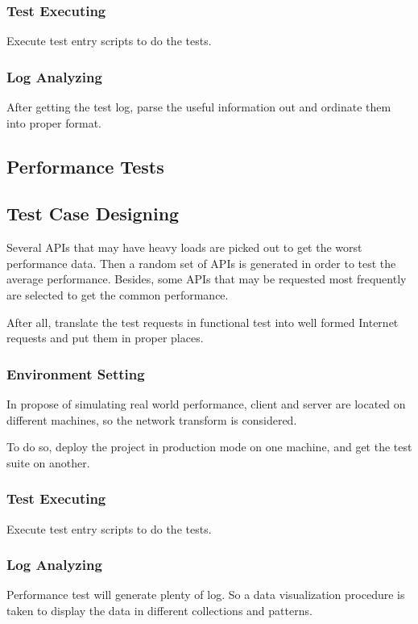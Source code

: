     \subsubsection{Test Executing}
      Execute test entry scripts to do the tests.
    \subsubsection{Log Analyzing}
      After getting the test log, parse the useful information out and ordinate them into proper format.
  \subsection{Performance Tests}
    \subsection{Test Case Designing}
      Several APIs that may have heavy loads are picked out to get the worst performance data.
      Then a random set of APIs is generated in order to test the average performance.
      Besides, some APIs that may be requested most frequently are selected to get the common performance.

      After all, translate the test requests in functional test into well formed Internet requests
      and put them in proper places.
    \subsubsection{Environment Setting}
      In propose of simulating real world performance,
      client and server are located on different machines, so the network transform is considered.

      To do so, deploy the project in production mode on one machine, and get the test suite on another.
    \subsubsection{Test Executing}
      Execute test entry scripts to do the tests.
    \subsubsection{Log Analyzing}
      Performance test will generate plenty of log.
      So a data visualization procedure is taken to display the data in different collections and patterns.
